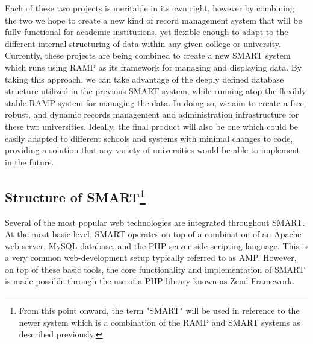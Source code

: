 \documentclass[12pt]{article}
\begin{document}
Each of these two projects is meritable in its own right, however by combining the two we hope to create a new kind of record management system that will be fully functional for academic institutions, yet flexible enough to adapt to the different internal structuring of data within any given college or university. Currently, these projects are being combined to create a new SMART system which runs using RAMP as its framework for managing and displaying data. By taking this approach, we can take advantage of the deeply defined database structure utilized in the previous SMART system, while running atop the flexibly stable RAMP system for managing the data. In doing so, we aim to create a free, robust, and dynamic records management and administration infrastructure for these two universities. Ideally, the final product will also be one which could be easily adapted to different schools and systems with minimal changes to code, providing a solution that any variety of universities would be able to implement in the future.

\subsection[Structure of SMART]{Structure of SMART\footnote{From this point onward, the term "SMART" will be used in reference to the newer system which is a combination of the RAMP and SMART systems as described previously.}}

Several of the most popular web technologies are integrated throughout SMART. At the most basic level, SMART operates on top of a combination of an Apache web server, MySQL database, and the PHP server-side scripting language. This is a very common web-development setup typically referred to as AMP. However, on top of these basic tools, the core functionality and implementation of SMART is made possible through the use of a PHP library known as Zend Framework.
\end{document}
